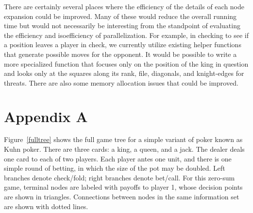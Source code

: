 \documentclass[11pt]{article}
\begin{document}
There are certainly several places where the efficiency of the details of each node expansion could be improved.  Many
of these would reduce the overall running time but would not necessarily be interesting from the standpoint of
evaluating the efficiency and isoefficiency of parallelization.  For example, in checking to see if a position leaves a
player in check, we currently utilize existing helper functions that generate possible moves for the opponent.  It would
be possible to write a more specialized function that focuses only on the position of the king in question and looks
only at the squares along its rank, file, diagonals, and knight-edges for threats.  There are also some memory
allocation issues that could be improved. 


\section{Appendix A}
Figure~\ref{fulltree} shows the full game tree for a simple variant of poker known as Kuhn poker.  There are three
cards: a king, a queen, and a jack.  The dealer deals one card to each of two players.  Each player antes one unit, and
there is one simple round of betting, in which the size of the pot may be doubled.  Left branches denote check/fold;
right branches denote bet/call.  For this zero-sum game, terminal nodes are labeled with payoffs to player 1, whose
decision points are shown in triangles.  Connections between nodes in the same information set are shown with dotted
lines.
\end{document}
